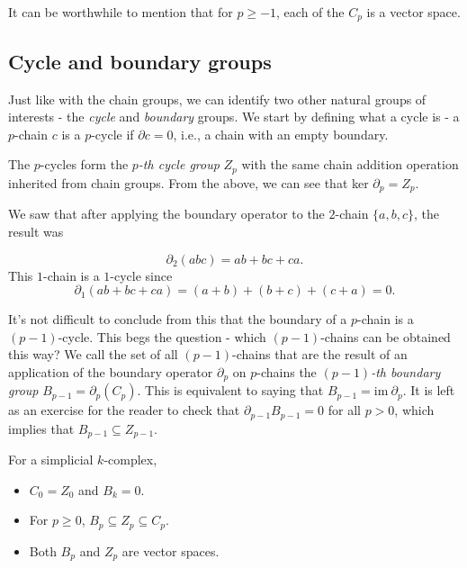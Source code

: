 \begin{figure}[h]
\end{figure}
It can be worthwhile to mention that for $p \geq -1$, each of the $C_{p}$ is a vector space.

\subsection{Cycle and boundary groups}
Just like with the chain groups, we can identify two other natural groups of interests - the \textit{cycle} and \textit{boundary} groups. We start by defining what a cycle is - a $p$-chain $c$ is a $p$-cycle if $\partial c = 0$, i.e., a chain with an empty boundary.

The $p$-cycles form the \textit{$p$-th cycle group} $Z_{p}$ with the same chain addition operation inherited from chain groups. From the above, we can see that ker $\partial_{p} = Z_{p}$.

We saw that after applying the boundary operator to the $2$-chain $\{a,b,c\}$, the result was

\begin{equation*}
  \partial_2(abc) = ab + bc + ca.
\end{equation*}
This $1$-chain is a $1$-cycle since
\begin{equation*}
  \partial_{1}(ab + bc + ca) = (a+b) + (b+c) + (c+a) = 0.
\end{equation*}

It's not difficult to conclude from this that the boundary of a $p$-chain is a $(p-1)$-cycle. This begs the question - which $(p-1)$-chains can be obtained this way? We call the set of all $(p-1)$-chains that are the result of an application of the boundary operator $\partial_{p}$ on $p$-chains the \textit{$(p-1)$-th boundary group} $B_{p-1} = \partial_{p}(C_{p})$. This is equivalent to saying that $B_{p-1} = \text{im} \: \partial_{p}$. It is left as an exercise for the reader to check that $\partial_{p-1}B_{p-1} = 0$ for all $p>0$, which implies that $B_{p-1} \subseteq Z_{p-1}$.

\begin{theorem}
  For a simplicial $k$-complex,
  \begin{itemize}
  \item $C_{0} = Z_{0}$ and $B_{k} = 0$.
  \item For $p \geq 0$, $B_{p} \subseteq Z_{p} \subseteq C_{p}$.
  \item Both $B_{p}$ and $Z_{p}$ are vector spaces.
  \end{itemize}
\end{theorem}

